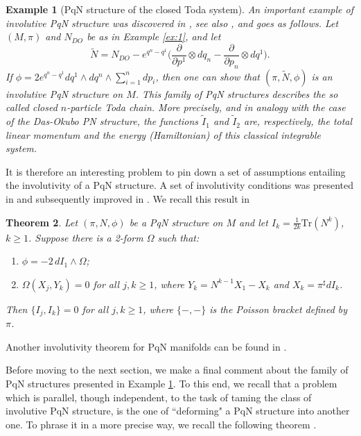 \documentclass[12pt]{article}
\newtheorem{theorem}{Theorem}%
\newtheorem{example}[theorem]{Example}
\begin{document}
\begin{example}[PqN structure of the closed Toda system]\label{ex:2}
An important example of involutive PqN structure 
was discovered in \cite{FMOP2020}, see also \cite{FMP2023}, and goes as follows. Let $(M,\pi)$ and $N_{DO}$ be as in Example \ref{ex:1}, and let
\begin{equation}
\label{PqN-Toda}
\widetilde{N}=N_{DO}-e^{q^n-q^1}\Big(\frac{\partial}{\partial p^1}\otimes dq_n-\frac{\partial}{\partial p_n}\otimes dq^1\Big).
\end{equation}
If $\phi=2e^{q^n-q^1}dq^1\wedge dq^n\wedge\sum_{i=1}^ndp_i$, then one can show that $(\pi,\widetilde N,\phi)$ is an involutive PqN structure on $M$. This family of PqN structures describes the so called \emph{closed $n$-particle Toda chain}. More precisely, and in analogy with the case of the Das-Okubo PN structure, the functions ${\tilde I}_1$ and 
${\tilde I}_2$ are, respectively, the total linear momentum and the energy (Hamiltonian) of this classical integrable system. 
\end{example}

It is therefore an interesting problem to pin down a set of assumptions entailing the involutivity of a PqN structure. 
A set of involutivity %
conditions %
was presented in \cite{FMOP2020} and subsequently improved in \cite{FMP2024}. We recall this result in 
\begin{theorem}\label{theo:inv} Let $(\pi,N,\phi)$ be a PqN structure on $M$ and let $I_k=\frac{1}{2k}\text{Tr}\left(N^k\right)$, $k\geq 1$. Suppose there is a 2-form $\Omega$ such that:
\begin{enumerate}
\item[(a)] $\phi=-2\,dI_1\wedge\Omega$;
\item[(b)] $\Omega(X_j,Y_k)=0$ for all $j,k\geq 1$, where $Y_k=N^{k-1}X_1-X_k$ and $X_k=\pi^\sharp dI_k$. 
\end{enumerate}
Then $\{I_j,I_k\}=0$ for all $j,k\ge 1$, where $\{-,-\}$ is the Poisson bracket defined by $\pi$.
\end{theorem}
Another involutivity theorem for PqN manifolds can be found in \cite{FMP2026}.

Before moving to the next section, we make a final comment about the family of PqN structures presented in Example \ref{ex:2}. To this end, we 
recall that 
a problem which is parallel, though independent, to the task of taming the class of involutive PqN structure, 
is the one of ``deforming" a PqN structure into another one. To phrase it in a more precise way, we recall the following theorem  \cite{FMOP2020,DMP2024}.
\end{document}
